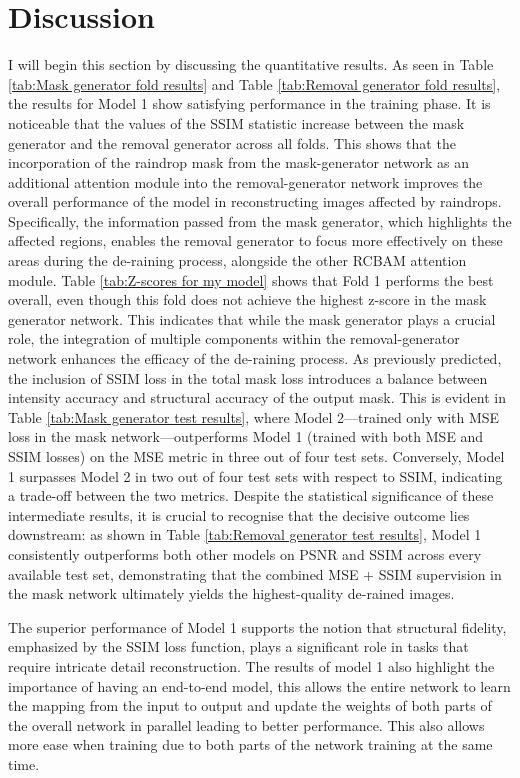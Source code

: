 \documentclass[11pt]{ociamthesis}  %
\begin{document}
\section{Discussion}
I will begin this section by discussing the quantitative results. As seen in Table \ref{tab:Mask generator fold results} and Table \ref{tab:Removal generator fold results}, the results for Model 1 show satisfying performance in the training phase. It is noticeable that the values of the SSIM statistic increase between the mask generator and the removal generator across all folds. This shows that the incorporation of the raindrop mask from the mask-generator network as an additional attention module into the removal-generator network improves the overall performance of the model in reconstructing images affected by raindrops. Specifically, the information passed from the mask generator, which highlights the affected regions, enables the removal generator to focus more effectively on these areas during the de-raining process, alongside the other RCBAM attention module. Table \ref{tab:Z-scores for my model} shows that Fold 1 performs the best overall, even though this fold does not achieve the highest z-score in the mask generator network. This indicates that while the mask generator plays a crucial role, the integration of multiple components within the removal-generator network enhances the efficacy of the de-raining process. As previously predicted, the inclusion of SSIM loss in the total mask loss introduces a balance between intensity accuracy and structural accuracy of the output mask. This is evident in Table \ref{tab:Mask generator test results}, where Model 2—trained only with MSE loss in the mask network—outperforms Model 1 (trained with both MSE and SSIM losses) on the MSE metric in three out of four test sets. Conversely, Model 1 surpasses Model 2 in two out of four test sets with respect to SSIM, indicating a trade-off between the two metrics. Despite the statistical significance of these intermediate results, it is crucial to recognise that the decisive outcome lies downstream: as shown in Table \ref{tab:Removal generator test results}, Model 1 consistently outperforms both other models on PSNR and SSIM across every available test set, demonstrating that the combined MSE + SSIM supervision in the mask network ultimately yields the highest-quality de-rained images. 

The superior performance of Model 1 supports the notion that structural fidelity, emphasized by the SSIM loss function, plays a significant role in tasks that require intricate detail reconstruction. The results of model 1 also highlight the importance of having an end-to-end model, this allows the entire network to learn the mapping from the input to output and update the weights of both parts of the overall network in parallel leading to better performance. This also allows more ease when training due to both parts of the network training at the same time. 
\end{document}
